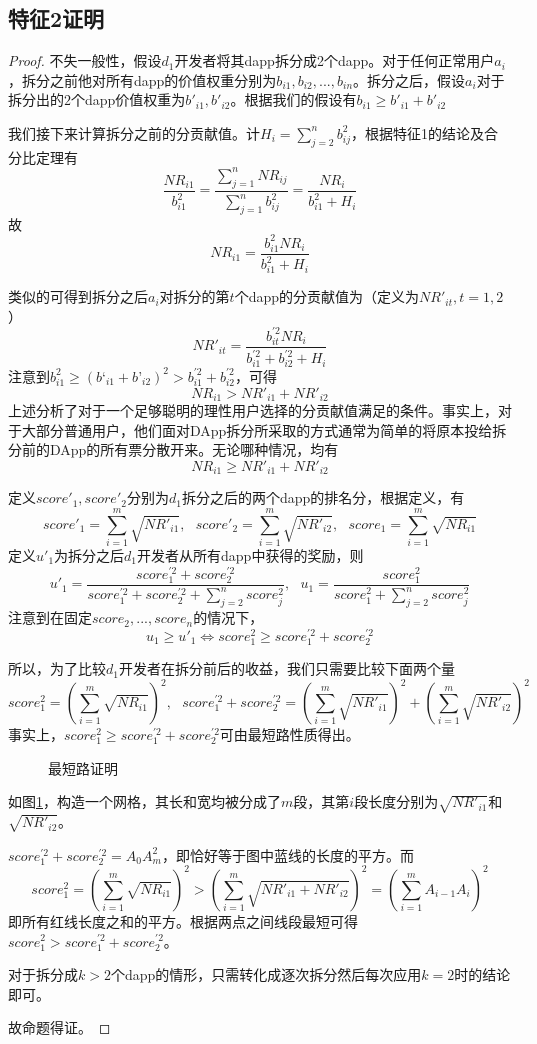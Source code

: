\subsection{特征2证明}
\begin{proof}
	 不失一般性，假设$d_1$开发者将其dapp拆分成2个dapp。对于任何正常用户$a_i$，拆分之前他对所有dapp的价值权重分别为$b_{i1},b_{i2},...,b_{in}$。拆分之后，假设$a_i$对于拆分出的$2$个dapp价值权重为$b'_{i1},b'_{i2}$。根据我们的假设有$b_{i1} \geq b'_{i1}+b'_{i2}$

	 我们接下来计算拆分之前的分贡献值。计$H_i = \sum_{j=2}^n b_{ij}^2$，根据特征1的结论及合分比定理有
	 $$\frac{NR_{i1}}{b_{i1}^2} = \frac{\sum_{j=1}^n NR_{ij}}{\sum_{j=1}^n b_{ij}^2} = \frac{NR_i}{b_{i1}^2+H_i}$$
	 故
	 $$NR_{i1}=\frac{b_{i1}^2NR_i}{b_{i1}^2+H_i}$$

     类似的可得到拆分之后$a_i$对拆分的第$t$个dapp的分贡献值为（定义为$NR'_{it},t=1,2$）
	 $$NR'_{it} =  \frac{b_{it}^{'2}NR_i}{b_{i1}^{'2}+b_{i2}^{'2}+H_i}$$
	 注意到$b_{i1}^2 \geq (b‘_{i1}+b’_{i2})^2 >b_{i1}^{'2}+b_{i2}^{'2}$，可得
	 $$NR_{i1} > NR'_{i1}+NR'_{i2}$$
	 上述分析了对于一个足够聪明的理性用户选择的分贡献值满足的条件。事实上，对于大部分普通用户，他们面对DApp拆分所采取的方式通常为简单的将原本投给拆分前的DApp的所有票分散开来。无论哪种情况，均有
	 	$$NR_{i1} \geq NR'_{i1}+NR'_{i2}$$

	 定义$score'_1,score'_2$分别为$d_1$拆分之后的两个dapp的排名分，根据定义，有
	 $$score'_1 =  \sum_{i=1}^m \sqrt{NR'_{i1}},~~~score'_2 =  \sum_{i=1}^m \sqrt{NR'_{i2}},~~~score_1 = \sum_{i=1}^m \sqrt{NR_{i1}}$$
	 定义$u'_1$为拆分之后$d_1$开发者从所有dapp中获得的奖励，则
	 $$u'_1=\frac{score_1^{'2}+score_2^{'2}}{score_1^{'2}+score_2^{'2}+\sum_{j=2}^n score_j^2},~~~u_1=\frac{score^2_1}{score_1^2+\sum_{j=2}^n score_j^2}$$
	 注意到在固定$score_2,...,score_n$的情况下，
	 $$ u_1 \geq u'_1 \Leftrightarrow score_1^2 \geq score_1^{'2}+score_2^{'2}$$

	 所以，为了比较$d_1$开发者在拆分前后的收益，我们只需要比较下面两个量
	 $$score_1^2 = (\sum_{i=1}^m \sqrt{NR_{i1}})^2,~~~score_1^{'2}+score_2^{'2}=  (\sum_{i=1}^m \sqrt{NR'_{i1}})^2+(\sum_{i=1}^m \sqrt{NR'_{i2}})^2$$
	 事实上，$score_1^2 \geq score_1^{'2}+score_2^{'2}$可由最短路性质得出。
	 \begin{figure}
	 	\centering
    
	 	\caption{最短路证明 \label{fig:path}}
	 \end{figure}
	 如图\ref{fig:path}，构造一个网格，其长和宽均被分成了$m$段，其第$i$段长度分别为$\sqrt{NR'_{i1}}$和$\sqrt{NR'_{i2}}$。

	 $score_1^{'2}+score_2^{'2}=A_0A_m^2$，即恰好等于图中蓝线的长度的平方。而
	 $$score_1^2 = (\sum_{i=1}^m \sqrt{NR_{i1}})^2 > (\sum_{i=1}^m \sqrt{NR'_{i1}+NR'_{i2}})^2 = (\sum_{i=1}^m A_{i-1}A_i)^2$$
	 即所有红线长度之和的平方。根据两点之间线段最短可得$score_1^2 >score_1^{'2}+score_2^{'2}$。

	 对于拆分成$k>2$个dapp的情形，只需转化成逐次拆分然后每次应用$k=2$时的结论即可。

	 故命题得证。
\end{proof}

